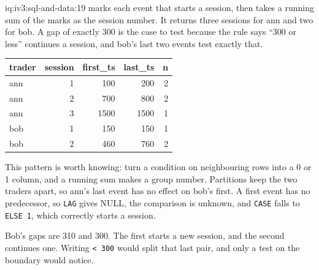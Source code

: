 \begin{solution}{iq:iv3:sql-and-data:19}
 marks each event that starts a session, then takes a running sum of the marks as the session number. It returns three sessions for ann and two for bob. A gap of exactly 300 is the case to test because the rule says ``300 or less'' continues a session, and bob's last two events test exactly that.
\label{lst:iv3:sq:sessions}
\begin{center}\small
\begin{tabular}{lrrrr}
trader & session & first\_ts & last\_ts & n\\\hline
ann & 1 & 100 & 200 & 2\\
ann & 2 & 700 & 800 & 2\\
ann & 3 & 1500 & 1500 & 1\\
bob & 1 & 150 & 150 & 1\\
bob & 2 & 460 & 760 & 2
\end{tabular}
\end{center}
This pattern is worth knowing: turn a condition on neighbouring rows into a 0 or 1 column, and a running sum makes a group number. Partitions keep the two traders apart, so ann's last event has no effect on bob's first. A first event has no predecessor, so \texttt{LAG} gives NULL, the comparison is unknown, and \texttt{CASE} falls to \texttt{ELSE 1}, which correctly starts a session.

Bob's gaps are 310 and 300. The first starts a new session, and the second continues one. Writing \texttt{< 300} would split that last pair, and only a test on the boundary would notice.

\end{solution}

